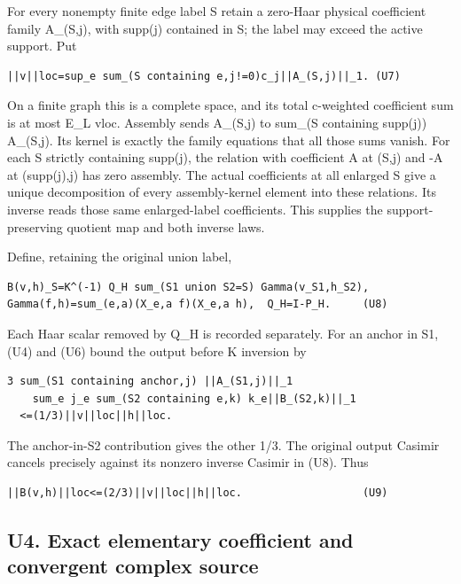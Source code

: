 \documentclass[11pt,a4paper]{article}
\newcounter{none}
\renewcommand{\[}{\begingroup\small\originaldisplaystart}
\renewcommand{\]}{\originaldisplayend\endgroup}
\begin{document}
For every nonempty finite edge label S retain a zero-Haar physical
coefficient family A\_(S,j), with supp(j) contained in S; the label may
exceed the active support. Put

\begin{verbatim}
||v||loc=sup_e sum_(S containing e,j!=0)c_j||A_(S,j)||_1. (U7)
\end{verbatim}

On a finite graph this is a complete space, and its total c-weighted
coefficient sum is at most \textbar E\_L\textbar{}
\textbar\textbar v\textbar\textbar loc. Assembly sends A\_(S,j) to
sum\_(S containing supp(j)) A\_(S,j). Its kernel is exactly the family
equations that all those sums vanish. For each S strictly containing
supp(j), the relation with coefficient A at (S,j) and -A at (supp(j),j)
has zero assembly. The actual coefficients at all enlarged S give a
unique decomposition of every assembly-kernel element into these
relations. Its inverse reads those same enlarged-label coefficients.
This supplies the support-preserving quotient map and both inverse laws.

Define, retaining the original union label,

\begin{verbatim}
B(v,h)_S=K^(-1) Q_H sum_(S1 union S2=S) Gamma(v_S1,h_S2),
Gamma(f,h)=sum_(e,a)(X_e,a f)(X_e,a h),  Q_H=I-P_H.     (U8)
\end{verbatim}

Each Haar scalar removed by Q\_H is recorded separately. For an anchor
in S1, (U4) and (U6) bound the output before K inversion by

\begin{verbatim}
3 sum_(S1 containing anchor,j) ||A_(S1,j)||_1
    sum_e j_e sum_(S2 containing e,k) k_e||B_(S2,k)||_1
  <=(1/3)||v||loc||h||loc.
\end{verbatim}

The anchor-in-S2 contribution gives the other 1/3. The original output
Casimir cancels precisely against its nonzero inverse Casimir in (U8).
Thus

\begin{verbatim}
||B(v,h)||loc<=(2/3)||v||loc||h||loc.                   (U9)
\end{verbatim}

\subsection{U4. Exact elementary coefficient and convergent complex
source}\label{u4.-exact-elementary-coefficient-and-convergent-complex-source}
\end{document}

